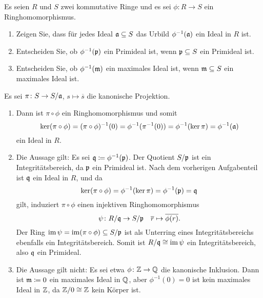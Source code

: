 \begin{question}[subtitle = Urbilder von Idealen]
  \label{question: preimages of ideals}
  Es seien $R$ und $S$ zwei kommutative Ringe und es sei $\phi \colon R \to S$ ein Ringhomomorphismus.
  \begin{enumerate}
    \item
      Zeigen Sie, dass für jedes Ideal $\mathfrak{a} \subseteq S$ das Urbild $\phi^{-1}(\mathfrak{a})$ ein Ideal in $R$ ist.
    \item
      Entscheiden Sie, ob $\phi^{-1}(\mathfrak{p})$ ein Primideal ist, wenn $\mathfrak{p} \subseteq S$ ein Primideal ist.
    \item
      Entscheiden Sie, ob $\phi^{-1}(\mathfrak{m})$ ein maximales Ideal ist, wenn $\mathfrak{m} \subseteq S$ ein maximales Ideal ist.
  \end{enumerate}
\end{question}


\begin{solution}
  Es sei $\pi \colon S \to S/\mathfrak{a}$, $s \mapsto \overline{s}$ die kanonische Projektion.
  \begin{enumerate}
    \item
      Dann ist $\pi \circ \phi$ ein Ringhomomorphismus und somit
      \[
          \ker (\pi \circ \phi)
        = (\pi \circ \phi)^{-1}(0)
        = \phi^{-1}( \pi^{-1}(0) )
        = \phi^{-1}(\ker \pi)
        = \phi^{-1}(\mathfrak{a})
      \]
      ein Ideal in $R$.
      
    \item
      Die Aussage gilt:
      Es sei $\mathfrak{q} \coloneqq \phi^{-1}(\mathfrak{p})$.
      Der Quotient $S/\mathfrak{p}$ ist ein Integritätsbereich, da $\mathfrak{p}$ ein Primideal ist.
      Nach dem vorherigen Aufgabenteil ist $\mathfrak{q}$ ein Ideal in $R$, und da
      \[
          \ker (\pi \circ \phi)
        = \phi^{-1}(\ker \pi)
        = \phi^{-1}(\mathfrak{p})
        = \mathfrak{q}
      \]
      gilt, induziert $\pi \circ \phi$ einen injektiven Ringhomomorphismus
      \[
        \psi \colon R/\mathfrak{q} \to S/\mathfrak{p}
        \quad
        \overline{r} \mapsto \overline{\phi(r)}.
      \]
      Der Ring $\operatorname{im} \psi = \operatorname{im} (\pi \circ \phi) \subseteq S/\mathfrak{p}$ ist als Unterring eines Integritätsbereichs ebenfalls ein Integritätsbereich.
      Somit ist $R/\mathfrak{q} \cong \operatorname{im} \psi$ ein Integritätsbereich, also $\mathfrak{q}$ ein Primideal.
      
    \item
      Die Aussage gilt nicht:
      Es sei etwa $\phi \colon \mathbb{Z} \to \mathbb{Q}$ die kanonische Inklusion.
      Dann ist $\mathfrak{m} \coloneqq 0$ ein maximales Ideal in $\mathbb{Q}$, aber $\phi^{-1}(0) = 0$ ist kein maximales Ideal in $\mathbb{Z}$, da $\mathbb{Z}/0 \cong \mathbb{Z}$ kein Körper ist.
  \end{enumerate}
\end{solution}


